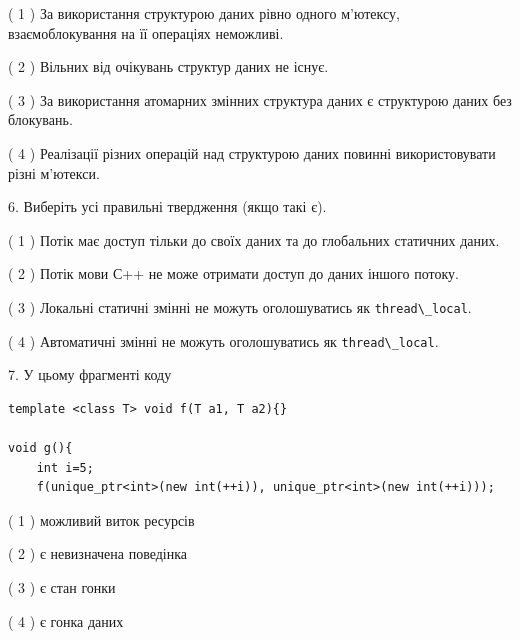 \documentclass[12pt, ukrainian]{article}
\def\code#1{\Verb!#1!}
\begin{document}
\begin {large}
{( 1 ) За використання структурою даних рівно одного м’ютексу, взаємоблокування на її операціях неможливі.%

( 2 ) Вільних від очікувань структур даних не існує.%

( 3 ) За використання атомарних змінних структура даних є структурою даних без блокувань.%

( 4 ) Реалізації різних операцій над структурою даних повинні використовувати різні м’ютекси.%
\newpage



\vspace{5mm}
6. Виберіть усі правильні твердження (якщо такі є).\par
\vspace{2mm}

( 1 ) Потік має доступ тільки до своїх даних та до глобальних статичних даних.%

( 2 ) Потік мови С++ не може отримати доступ до даних іншого потоку.%

( 3 ) Локальні статичні змінні не можуть оголошуватись як \code{thread\_local}.%

( 4 ) Автоматичні змінні не можуть оголошуватись як \code{thread\_local}.%


\vspace{5mm}
7. У цьому фрагменті коду
\begin{verbatim}
template <class T> void f(T a1, T a2){}

void g(){
    int i=5;
    f(unique_ptr<int>(new int(++i)), unique_ptr<int>(new int(++i)));
\end{verbatim}

( 1 ) можливий виток ресурсів%

( 2 ) є невизначена поведінка%

( 3 ) є стан гонки%

( 4 ) є гонка даних%
}
\end {large}
\end{document}
